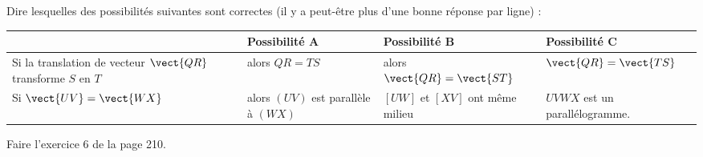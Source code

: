 
\begin{exercice}\label{exosmath-0593}

    Dire lesquelles des possibilités suivantes sont correctes (il y a peut-être plus d'une bonne réponse par ligne) :

    \begin{center}

        \begin{tabular}[]{|p{4.5cm}|p{4cm}|p{4cm}|p{4cm}|}
        \hline
        &Possibilité A&Possibilité B&Possibilité C\\
        \hline
        Si la translation de vecteur \( \vect{ QR }\) transforme \( S\) en \( T\)&alors \( QR=TS\)&alors \( \vect{ QR }=\vect{ ST }\)&\( \vect{ QR }=\vect{ TS }\)\\
        \hline
        Si \( \vect{ UV }=\vect{ WX }\)&alors \( (UV)\) est parallèle à \( (WX)\)&\( [UW]\) et \( [XV]\) ont même milieu&\( UVWX\) est un parallélogramme.\\
        \hline
    \end{tabular}
        
    \end{center}

    Faire l'exercice 6 de la page 210.

\end{exercice}
